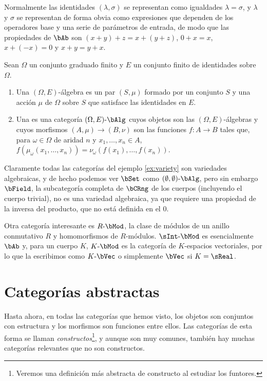 Normalmente las identidades $(\lambda, \sigma)$ se representan como igualdades
$\lambda=\sigma$, y $\lambda$ y $\sigma$ se representan de forma obvia como
expresiones que dependen de los operadores base y una serie de parámetros de
entrada, de modo que las propiedades de $\bAb$ son $(x+y)+z=x+(y+z)$, $0+x=x$,
$x+(-x)=0$ y $x+y=y+x$.

\begin{definition}
  Sean $\Omega$ un conjunto graduado finito y $E$ un conjunto finito de
  identidades sobre $\Omega$.
  \begin{enumerate}
  \item Una $(\Omega,E)$-álgebra es un par $(S,\mu)$ formado por un conjunto $S$
    y una acción $\mu$ de $\Omega$ sobre $S$ que satisface las identidades en
    $E$.
  \item Una  es una categoría $(\Omega,E)\dash\bAlg$
    cuyos objetos son las $(\Omega,E)$-álgebras y cuyos morfismos
    $(A,\mu)\to (B,\nu)$ son las funciones $f:A\to B$ tales que, para
    $\omega\in\Omega$ de aridad $n$ y $x_1,\dots,x_n\in A$,
    $f(\mu_\omega(x_1,\dots,x_n))=\nu_\omega(f(x_1),\dots,f(x_n))$.
  \end{enumerate}
\end{definition}

Claramente todas las categorías del ejemplo \ref{ex:variety} son variedades
algebraicas, y de hecho podemos ver $\bSet$ como
$(\emptyset,\emptyset)\dash\bAlg$, pero sin embargo $\bField$, la subcategoría
completa de $\bCRng$ de los cuerpos (incluyendo el cuerpo trivial), no es una
variedad algebraica, ya que requiere una propiedad de la inversa del producto,
que no está definida en el 0.

Otra categoría interesante es $R\dash\bMod$, la clase de módulos de un anillo
conmutativo $R$ y homomorfismos de $R$-módulos. $\sInt\dash\bMod$ es
esencialmente $\bAb$ y, para un cuerpo $K$, $K\dash\bMod$ es la categoría de
$K$-espacios vectoriales, por lo que la escribimos como $K\dash\bVec$ o
simplemente $\bVec$ si $K=\sReal$.

\section{\label{sec:cat-abstract}Categorías abstractas}

Hasta ahora, en todas las categorías que hemos visto, los objetos son conjuntos
con estructura y los morfismos son funciones entre ellos. Las categorías de esta
forma se llaman \emph{constructos}\footnote{Veremos una definición más abstracta
  de constructo al estudiar los funtores.}, y aunque son muy comunes, también
hay muchas categorías relevantes que no son constructos.

